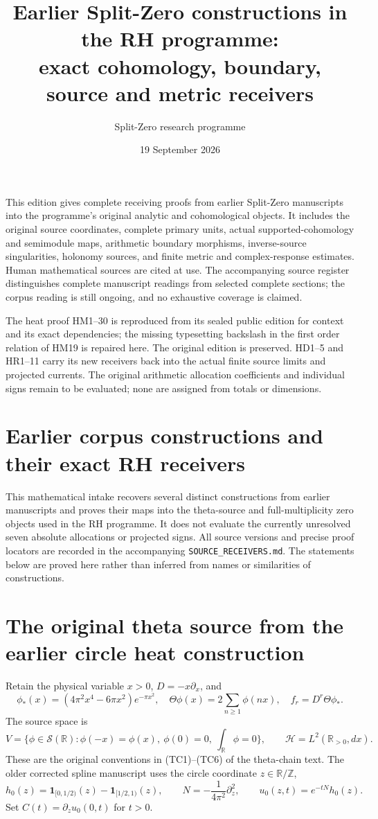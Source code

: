 \documentclass[11pt]{article}
\title{Earlier Split-Zero constructions in the RH programme:\\exact cohomology, boundary, source and metric receivers}
\author{Split-Zero research programme}
\date{19 September 2026}
\begin{document}
\maketitle
This edition gives complete receiving proofs from earlier Split-Zero
manuscripts into the programme's original analytic and cohomological objects.
It includes the original source coordinates, complete primary units,
actual supported-cohomology and semimodule maps, arithmetic boundary
morphisms, inverse-source singularities, holonomy sources, and finite
metric and complex-response estimates. Human mathematical sources are
cited at use. The accompanying source register distinguishes complete
manuscript readings from selected complete sections; the corpus reading
is still ongoing, and no exhaustive coverage is claimed.

The heat proof HM1--30 is reproduced from its sealed public edition for
context and its exact dependencies; the missing typesetting backslash
in the first order relation of HM19 is repaired here. The original edition
is preserved. HD1--5 and HR1--11 carry its new
receivers back into the actual finite source limits and projected currents.
The original arithmetic allocation coefficients and individual signs
remain to be evaluated; none are assigned from totals or dimensions.

\clearpage
\begingroup
\def\C{\mathbb C}
\def\R{\mathbb R}
\def\B{\mathscr B}
\def\M{\mathcal M}
\section*{Earlier corpus constructions and their exact RH receivers}

This mathematical intake recovers several distinct constructions from
earlier manuscripts and proves their maps into the theta-source and
full-multiplicity zero objects used in the RH programme. It does not evaluate
the currently unresolved seven absolute allocations or projected signs.
All source versions and precise proof locators are recorded in the accompanying
\texttt{SOURCE\_RECEIVERS.md}. The statements below are proved here rather than
inferred from names or similarities of constructions.

\section{The original theta source from the earlier circle heat construction}
Retain the physical variable $x>0$, $D=-x\partial_x$, and
\[
 \phi_*(x)=(4\pi^2x^4-6\pi x^2)e^{-\pi x^2},\quad
 \Theta\phi(x)=2\sum_{n\geq1}\phi(nx),\quad f_r=D^r\Theta\phi_*.
\]
The source space is
\[
 V=\{\phi\in\mathcal S(\R):\phi(-x)=\phi(x),\ \phi(0)=0,
                  \ \int_\R\phi=0\},\qquad \mathcal H=L^2(\R_{>0},dx).
\]
These are the original conventions in (TC1)--(TC6) of the theta-chain text.
The older corrected spline manuscript uses the circle coordinate $z\in\R/\mathbb Z$,
\[
 h_0(z)=\mathbf1_{[0,1/2)}(z)-\mathbf1_{[1/2,1)}(z),\qquad
 N=-\frac1{4\pi^2}\partial_z^2,\qquad u_0(z,t)=e^{-tN}h_0(z).
\]
Set $C(t)=\partial_z u_0(0,t)$ for $t>0$.
\end{document}
